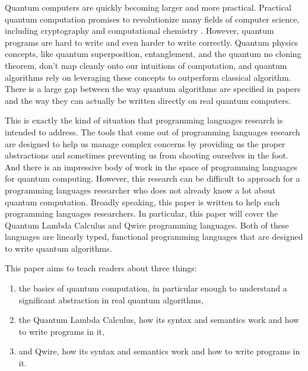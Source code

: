 Quantum computers are quickly becoming larger and more practical.
Practical quantum computation promises to revolutionize many fields of computer science, including cryptography  and computational chemistry .
However, quantum programs are hard to write and even harder to write correctly.
Quantum physics concepts, like quantum superposition, entanglement, and the quantum no cloning theorem, don't map cleanly onto our intuitions of computation, and quantum algorithms rely on leveraging these concepts to outperform classical algorithm.
There is a large gap between the way quantum algorithms are specified in papers and the way they can actually be written directly on real quantum computers.

This is exactly the kind of situation that programming languages research is intended to address.
The tools that come out of programming languages research are designed to help us manage complex concerns by providing us the proper abstractions and sometimes preventing us from shooting ourselves in the foot.
And there is an impressive body of work in the space of programming languages for quantum computing.
However, this research can be difficult to approach for a programming languages researcher who does not already know a lot about quantum computation.
Broadly speaking, this paper is written to help such programming languages researchers.
In particular, this paper will cover the Quantum Lambda Calculus and Qwire programming languages.
Both of these languages are linearly typed, functional programming languages that are designed to write quantum algorithms.

This paper aims to teach readers about three things:
\begin{enumerate}
    \item the basics of quantum computation, in particular enough to understand a significant abstraction in real quantum algorithms,
    \item the Quantum Lambda Calculus, how its syntax and semantics work and how to write programs in it,
    \item and Qwire, how its syntax and semantics work and how to write programs in it.
\end{enumerate}